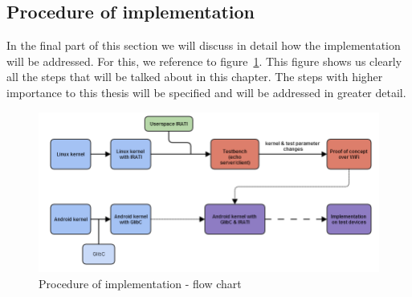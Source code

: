 \subsection{Procedure of implementation}


In the final part of this section we will discuss in detail how the implementation will be addressed. For this, we reference to figure~\ref{fig:poi-flowchart}. This figure shows us clearly all the steps that will be talked about in this chapter. The steps with higher importance to this thesis will be specified and will be addressed in greater detail. 

\npar

\begin{figure}[H]
    \centering
    \includegraphics[width=1\textwidth]{figures/procedureofimplementation}
    \caption{Procedure of implementation - flow chart} 
    \label{fig:poi-flowchart}
\end{figure}

\npar

